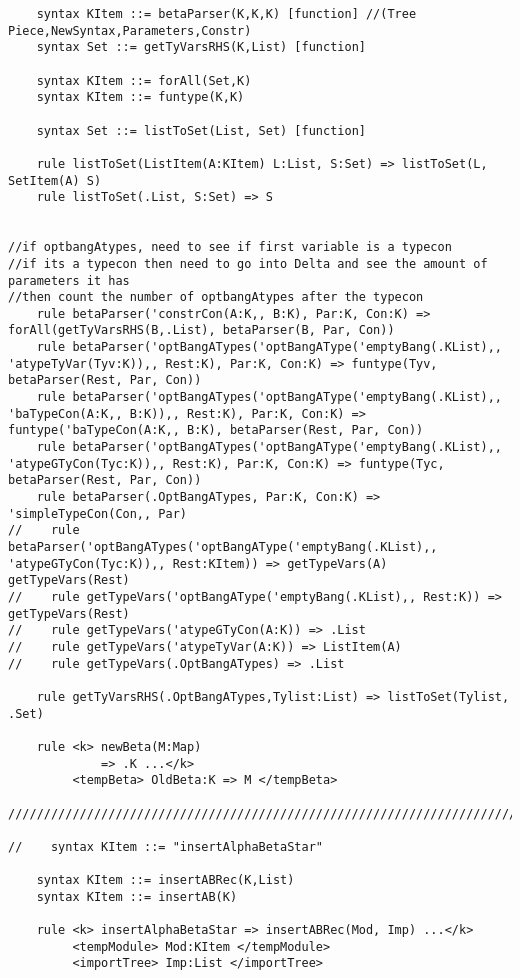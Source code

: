 \begin{lstlisting}
    syntax KItem ::= betaParser(K,K,K) [function] //(Tree Piece,NewSyntax,Parameters,Constr)
    syntax Set ::= getTyVarsRHS(K,List) [function]

    syntax KItem ::= forAll(Set,K)
    syntax KItem ::= funtype(K,K)

    syntax Set ::= listToSet(List, Set) [function]

    rule listToSet(ListItem(A:KItem) L:List, S:Set) => listToSet(L, SetItem(A) S)
    rule listToSet(.List, S:Set) => S


//if optbangAtypes, need to see if first variable is a typecon
//if its a typecon then need to go into Delta and see the amount of parameters it has
//then count the number of optbangAtypes after the typecon
    rule betaParser('constrCon(A:K,, B:K), Par:K, Con:K) => forAll(getTyVarsRHS(B,.List), betaParser(B, Par, Con))
    rule betaParser('optBangATypes('optBangAType('emptyBang(.KList),, 'atypeTyVar(Tyv:K)),, Rest:K), Par:K, Con:K) => funtype(Tyv, betaParser(Rest, Par, Con))
    rule betaParser('optBangATypes('optBangAType('emptyBang(.KList),, 'baTypeCon(A:K,, B:K)),, Rest:K), Par:K, Con:K) => funtype('baTypeCon(A:K,, B:K), betaParser(Rest, Par, Con))
    rule betaParser('optBangATypes('optBangAType('emptyBang(.KList),, 'atypeGTyCon(Tyc:K)),, Rest:K), Par:K, Con:K) => funtype(Tyc, betaParser(Rest, Par, Con))
    rule betaParser(.OptBangATypes, Par:K, Con:K) => 'simpleTypeCon(Con,, Par)
//    rule betaParser('optBangATypes('optBangAType('emptyBang(.KList),, 'atypeGTyCon(Tyc:K)),, Rest:KItem)) => getTypeVars(A) getTypeVars(Rest)
//    rule getTypeVars('optBangAType('emptyBang(.KList),, Rest:K)) => getTypeVars(Rest)
//    rule getTypeVars('atypeGTyCon(A:K)) => .List
//    rule getTypeVars('atypeTyVar(A:K)) => ListItem(A)
//    rule getTypeVars(.OptBangATypes) => .List

    rule getTyVarsRHS(.OptBangATypes,Tylist:List) => listToSet(Tylist, .Set)

    rule <k> newBeta(M:Map)
             => .K ...</k>
         <tempBeta> OldBeta:K => M </tempBeta>

////////////////////////////////////////////////////////////////////////////////////////////////////////////////////////

//    syntax KItem ::= "insertAlphaBetaStar"

    syntax KItem ::= insertABRec(K,List)
    syntax KItem ::= insertAB(K)

    rule <k> insertAlphaBetaStar => insertABRec(Mod, Imp) ...</k>
         <tempModule> Mod:KItem </tempModule>
         <importTree> Imp:List </importTree>


\end{lstlisting}
